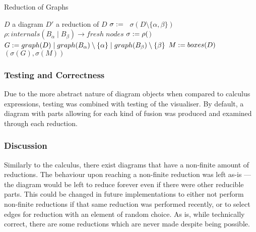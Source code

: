         \begin{breakablealgorithm}
            \caption{Reduction of Graphs}
            \begin{algorithmic}[1]
                \Require$D$ a diagram
                \Ensure$D'$ a reduction of $D$
                                \State$\sigma :=$~
                                \State\Return$\sigma(D \setminus \{\alpha, \beta\})$
                            \EndIf
                        \EndFor
                    \EndFor\\

                                \State$\rho : internals(B_{\alpha} \; | \; B_{\beta}) \rightarrow fresh\;nodes$
                                \State$\sigma := \rho($$)$
                                \State$G := graph(D) \; | \; graph(B_{\alpha}) \setminus \{\alpha\} \; | \; graph(B_{\beta}) \setminus \{\beta\}$
                                \State$M := boxes(D)$
                                \State\Return$(\sigma(G), \sigma(M))$
                            \EndIf
                        \EndFor
                    \EndFor
                \EndFunction
            \end{algorithmic}
        \end{breakablealgorithm}
        
    \subsubsection{Testing and Correctness}
        Due to the more abstract nature of diagram objects when compared to calculus expressions, testing was combined with testing of the visualiser.
        By default, a diagram with parts allowing for each kind of fusion was produced and examined through each reduction.
        
    \subsubsection{Discussion}
        Similarly to the calculus, there exist diagrams that have a non-finite amount of reductions.
        The behaviour upon reaching a non-finite reduction was left as-is --- the diagram would be left to reduce forever even if there were other reducible parts.
        This could be changed in future implementations to either not perform non-finite reductions if that same reduction was performed recently, or to select edges for reduction with an element of random choice.
        As is, while technically correct, there are some reductions which are never made despite being possible.\\

